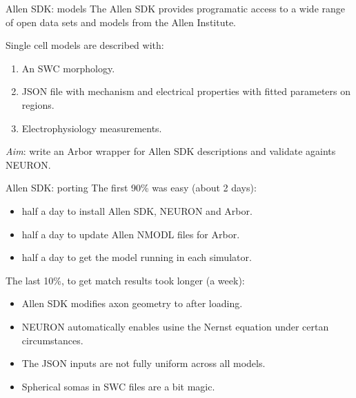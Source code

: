 \documentclass[aspectratio=43]{beamer}
\newcommand{\arbor}{{\ttfamily Arbor}\xspace}
\newcommand{\neuron}{{\ttfamily NEURON}\xspace}
\begin{document}
\begin{frame}[fragile]{Allen SDK: models}
    The Allen SDK provides programatic access to a wide range of open data sets and models from the Allen Institute.

    \vspace{10pt}
    Single cell models are described with:
    \begin{enumerate}
        \item An SWC morphology.
        \item JSON file with mechanism and electrical properties with fitted parameters on regions.
        \item Electrophysiology measurements.
    \end{enumerate}
    \vspace{10pt}
    \emph{Aim}: write an \arbor wrapper for Allen SDK descriptions and validate againts \neuron.
\end{frame}
\begin{frame}[fragile]{Allen SDK: porting}
    The first 90\% was easy (about 2 days):
    \begin{itemize}
        \item half a day to install Allen SDK, \neuron and \arbor.
        \item half a day to update Allen NMODL files for \arbor.
        \item half a day to get the model running in each simulator.
    \end{itemize}
    \vfill

    The last 10\%, to get match results took longer (a week):
    \begin{itemize}
        \item Allen SDK modifies axon geometry to after loading.
        \item \neuron automatically enables usine the Nernst equation under certan circumstances.
        \item The JSON inputs are not fully uniform across all models.
        \item Spherical somas in SWC files are a bit magic.
    \end{itemize}
\end{frame}
\end{document}

